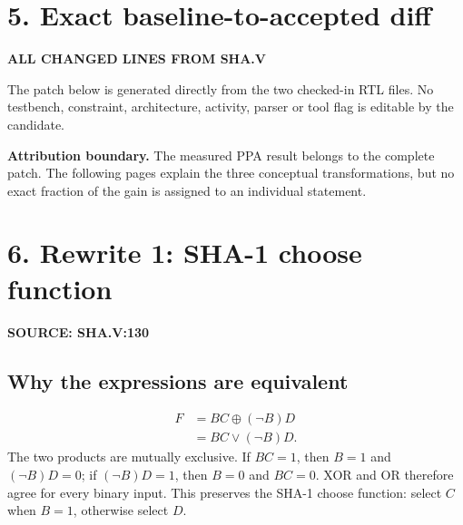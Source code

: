 \documentclass[10pt,a4paper]{article}
\newcommand{\smallcaps}[1]{\textcolor{Mid}{\fontsize{8.5}{10}\selectfont\bfseries\MakeUppercase{#1}}}
\newcommand{\newpageheading}[2]{\clearpage\section{#1}\smallcaps{#2}\vspace{6pt}}
\begin{document}
\newpageheading{5. Exact baseline-to-accepted diff}{All changed lines from sha.v}

The patch below is generated directly from the two checked-in RTL files. No testbench, constraint, architecture, activity, parser or tool flag is editable by the candidate.



\begin{scopebox}
\textbf{Attribution boundary.} The measured PPA result belongs to the complete patch. The following pages explain the three conceptual transformations, but no exact fraction of the gain is assigned to an individual statement.
\end{scopebox}

\newpageheading{6. Rewrite 1: SHA-1 choose function}{Source: sha.v:130}

\begin{center}
\end{center}

\subsection{Why the expressions are equivalent}
\begin{align*}
F &= BC \oplus (\neg B)D \\
  &= BC \lor (\neg B)D.
\end{align*}
The two products are mutually exclusive. If $BC=1$, then $B=1$ and $(\neg B)D=0$; if $(\neg B)D=1$, then $B=0$ and $BC=0$. XOR and OR therefore agree for every binary input. This preserves the SHA-1 choose function: select $C$ when $B=1$, otherwise select $D$.
\end{document}
